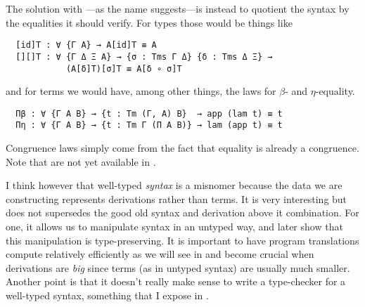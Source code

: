 The solution with ---as the name suggests---is instead to
quotient the syntax by the equalities it should verify.
For types those would be things like
\begin{verbatim}
  [id]T : ∀ {Γ A} → A[id]T ≡ A
  [][]T : ∀ {Γ Δ Ξ A} → {σ : Tms Γ Δ} {δ : Tms Δ Ξ} →
            (A[δ]T)[σ]T ≡ A[δ ∘ σ]T
\end{verbatim}
and for terms we would have, among other things, the laws for \(\beta\)- and
\(\eta\)-equality.
\begin{verbatim}
  Πβ : ∀ {Γ A B} → {t : Tm (Γ, A) B}  → app (lam t) ≡ t
  Πη : ∀ {Γ A B} → {t : Tm Γ (Π A B)} → lam (app t) ≡ t
\end{verbatim}
Congruence laws simply come from the fact that equality is already a congruence.
Note that  are not yet available in \Agda.

I think however that well-typed \emph{syntax} is a misnomer because the data we
are constructing represents derivations rather than terms.
It is very interesting but does not supersedes the good old syntax and
derivation above it combination.
For one, it allows us to manipulate syntax in an untyped way, and later show
that this manipulation is type-preserving. It is important to have program
translations compute relatively efficiently as we will see in
 and become crucial when derivations are
\emph{big} since terms (as in untyped syntax) are usually
much smaller. Another point is that it doesn't really make sense to write a
type-checker for a well-typed syntax, something that I expose in
.